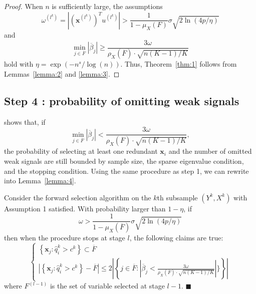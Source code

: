 \documentclass[11pt,review,authoryear]{elsarticle}
\begin{document}
\begin{appendices}
\begin{proof}
  When $n$ is sufficiently large, the assumptions
  \[
      \omega^{\left(l^k \right)} = \left\vert \left( \mathbf{x}^{\left( l^k \right)}\right) ^T u^{\left(l^{k}\right)} \right\vert >\frac{1}{1-\mu_{X}\left(F\right)}\sigma\sqrt{2\ln\left(4p/\eta\right)}
  \]
  and
  \[
      \min_{j\in\overline{F}}\left|\overline{\beta}_{j}\right|\geqslant\frac{3\omega}{\rho_{X}\left(\overline{F}\right)\cdot\sqrt{n\left(K-1\right)/K}}
  \]
  hold with $\eta = \exp\left(-n^s/\log(n)\right)$. Thus, Theorem~\ref{thm:1} follows from Lemmas~\ref{lemma:2} and \ref{lemma:3}.
\end{proof}



\subsection*{Step 4 : probability of omitting weak signals}

\citet[Theorem 2]{zhang09} shows that, if
%
\begin{displaymath}
  \min_{j\in\overline{F}}\left|\overline{\beta}_{j}\right| < \frac{3\omega}{\rho_{X}\left(\overline{F}\right)\cdot\sqrt{n\left(K-1\right)/K}},
\end{displaymath}
%
the probability of selecting at least one redundant $\mathbf{x}_i$ and the number of omitted weak signals are still bounded by sample size, the sparse eigenvalue condition, and the stopping condition. Using the same procedure as step 1, we can rewrite \citet[Theorem 2]{zhang09} into Lemma~\ref{lemma:4}.

\begin{lemma}
  \label{lemma:4}
  Consider the forward selection algorithm on the $k$th subsample $\left(Y^{k},X^{k}\right)$ with Assumption 1 satisfied. With probability larger than $1-\eta$, if
  \begin{equation}
    \omega > \frac{1}{1-\mu_X \left( \overline{F} \right)} \sigma\sqrt{ 2 \ln \left( 4p / \eta \right)}
  \end{equation}
  then when the procedure stops at stage $l$, the following claims are true:
  \[
  \begin{cases}
    \left\{ \mathbf{x}_{j}:\widehat{q}_{i}^{k}>c^k\right\} \subset \overline{F}\\
    \left\vert \left\{ \mathbf{x}_{j}:\widehat{q}_{i}^{k}>c^k\right\} -  \overline{F} \right\vert \leqslant 2 \left\vert \left\{ j \in \overline{F} : \left\vert \overline{\beta}_j < \frac{3 \omega}{\rho_{X}\left(\overline{F}\right) \cdot \sqrt{n\left(K-1\right)/K}} \right\vert \}\right\} \right\vert
  \end{cases}
  \]
  where $F^{\left(l-1\right)}$ is the set of variable selected at stage $l-1$. $\blacksquare$
\end{lemma}


\end{appendices}
\end{document}
